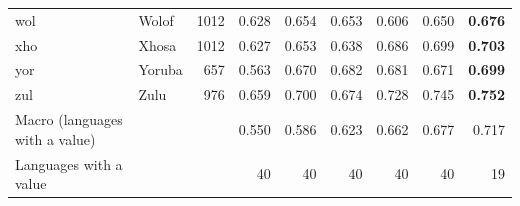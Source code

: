 {\begin{longtable}{@{}llrrrrrrr@{}}
wol & Wolof & 1012 & 0.628 & 0.654 & 0.653 & 0.606 & 0.650 & \textbf{0.676} \\
xho & Xhosa & 1012 & 0.627 & 0.653 & 0.638 & 0.686 & 0.699 & \textbf{0.703} \\
yor & Yoruba & 657 & 0.563 & 0.670 & 0.682 & 0.681 & 0.671 & \textbf{0.699} \\
zul & Zulu & 976 & 0.659 & 0.700 & 0.674 & 0.728 & 0.745 & \textbf{0.752} \\
\midrule
Macro (languages with a value) & & & 0.550 & 0.586 & 0.623 & 0.662 & 0.677 & 0.717 \\
Languages with a value & & & 40 & 40 & 40 & 40 & 40 & 19 \\
\end{longtable}}

